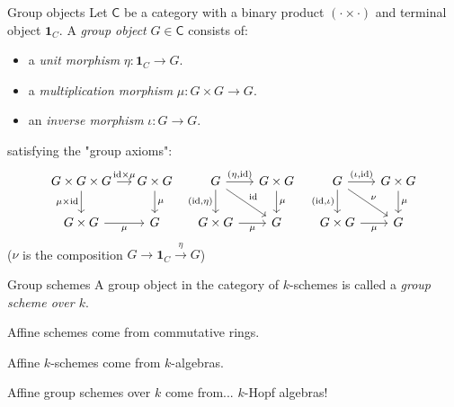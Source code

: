\documentclass[10pt, handout]{beamer}
\def\id{\mathrm{id}}
\begin{document}
\begin{frame}{Group objects}
    Let $\mathsf C$ be a category with a binary product $(\cdot \times \cdot)$ and terminal object $\mathbf 1_C$.
    A \emph{group object} $G \in \mathsf C$ consists of:
    \begin{itemize}
        \item a \emph{unit morphism} $\eta : \mathbf{1}_C \to G$.
        \item a \emph{multiplication morphism} $\mu : G \times G \to G$.
        \item an \emph{inverse morphism} $\iota : G \to G$.
    \end{itemize}

    \pause

    satisfying the "group axioms":
    \[
    \begin{tikzcd}[ampersand replacement=\&, column sep=small]
        G \times G \times G  \ar[r,"\id \times \mu"] \ar[d,"\mu \times \id"']
        \& G \times G  \ar[d,"\mu"]
        \& G \ar[r, "{(\eta ,\id)}"] \ar[d,"{(\id ,\eta)}"'] \ar[dr,"\id"]
        \& G \times G \ar[d,"\mu"]
        \& G \ar[r,"{(\iota ,\id)}"] \ar[d,"{(\id ,\iota)}"']  \ar[dr,"\nu"]
        \& G \times G \ar[d,"\mu"]
        \\
        G \times G \ar[r,"\mu"']
        \& G
        \& G \times G \ar[r,"\mu"']
        \& G
        \& G \times G \ar[r,"\mu"']
        \& G
    \end{tikzcd}
    \]
     ($\nu$ is the composition $G \to \mathbf{1}_C \xrightarrow{\eta} G$)
\end{frame}


\begin{frame}{Group schemes}
    A group object in the category of $k$-schemes is called a \emph{group scheme over $k$}.

    \pause

    Affine schemes come from commutative rings.

    Affine $k$-schemes come from $k$-algebras.

    Affine group schemes over $k$ come from... \pause $k$-Hopf algebras!
\end{frame}
\end{document}
